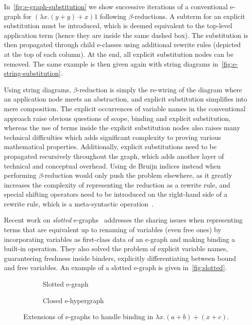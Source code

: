 In~\autoref{fig:e-graph-substitution} we show successive iterations of a conventional e-graph for $(\lambda x . (y + y) + x) 1$ following $\beta$-reductions.
A subterm for an explicit substitution must be introduced, which is deemed equivalent to the top-level application term (hence they are inside the same dashed box).
The substitution is then propagated through child e-classes using additional rewrite rules (depicted at the top of each column).
At the end, all explicit substitution nodes can be removed.
The same example is then given again with string diagrams in~\autoref{fig:e-string-substitution}.

Using string diagrams, $\beta$-reduction is simply the re-wiring of the diagram where an application node meets an abstraction, and explicit substitution simplifies into mere composition.
The explicit occurrences of variable names in the conventional approach raise obvious questions of scope, binding and explicit substitution, whereas the use of terms inside the explicit substitution nodes also raises many technical difficulties which adds significant complexity to proving various mathematical properties.
Additionally, explicit substitutions need to be propagated recursively throughout the graph, which adds another layer of technical and conceptual overhead.
Using de Bruijn indices instead when performing $\beta$-reduction would only push the problem elsewhere, as it greatly increases the complexity of representing the reduction as a rewrite rule, and special shifting operators need to be introduced on the right-hand side of a rewrite rule, which is a meta-syntactic operation~\cite{koehler2022sketchguided}.

Recent work on \emph{slotted} e-graphs~\cite{slotted-egraphs} addresses the sharing issues when representing terms that are equivalent up to renaming of variables (even free ones) by incorporating variables as first-class data of an e-graph and making binding a built-in operation.
They also solved the problem of explicit variable names, guaranteeing freshness inside binders, explicitly differentiating between bound and free variables.
An example of a slotted e-graph is given in~\autoref{fig:slotted}.

\begin{figure}[t!]
	\captionsetup{skip=0pt}
	\begin{subfigure}[b]{0.45\linewidth}
		\centering
		\caption{Slotted e-graph}%
		\label{fig:slotted}
	\end{subfigure}
	\hfill
	\begin{subfigure}[b]{0.45\linewidth}
		\centering
		\caption{Closed e-hypergraph}%
		\label{fig:closed}
	\end{subfigure}
	\caption{Extensions of e-graphs to handle binding in $\lambda x . (a + b) + (x + c)$.}%
	\label{fig:extended-egraphs}
\end{figure}

